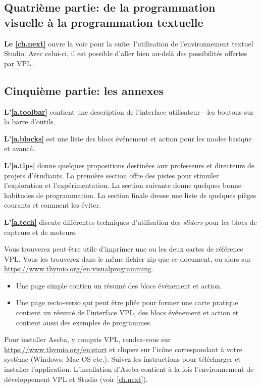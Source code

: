 \bigskip

\subsection*{Quatrième partie: de la programmation visuelle à la programmation textuelle}
\textbf{Le \cref{ch.next}} ouvre la voie pour la suite: l'utilisation de l'environnement textuel Studio.
Avec celui-ci, il est possible d'aller bien au-delà des possibilités offertes par VPL.

\bigskip

\subsection*{Cinquième partie: les annexes}

\textbf{L'\cref{a.toolbar}} contient une description de l'interface utilisateur---les boutons sur la barre d'outils.

\textbf{L'\cref{a.blocks}} est une liste des blocs événement et action pour les modes basique et avancé.

\textbf{L'\cref{a.tips}} donne quelques propositions destinées aux professeurs et directeurs de projets d'étudiants.
La première section offre des pistes pour stimuler l'exploration et l'expérimentation.
La section suivante donne quelques bonne habitudes de programmation.
La section finale dresse une liste de quelques pièges courants et comment les éviter.

\textbf{L'\cref{a.tech}} discute différentes techniques d'utilisation des \textit{sliders} pour les blocs de capteurs et de moteurs.

 \quad {}

Vous trouverez peut-être utile d'imprimer une ou les deux cartes de référence VPL.
Vous les trouverez dans le même fichier zip que ce document, ou alors sur \href{https://www.thymio.org/en:visualprogramming}{https://www.thymio.org/en:visualprogramming}.

\begin{itemize}
\item Une page simple contien un résumé des blocs événement et action.
\item Une page recto-verso qui peut être pliée pour former une carte pratique contient un résumé de l'interface VPL, des blocs événement et action et contient aussi des exemples de programmes.
\end{itemize}

Pour installer Aseba, y compris VPL, rendez-vous sur
\href{https://www.thymio.org/en:start}{https://www.thymio.org/en:start}
et cliquez sur l'icône correspondant à votre système (Windows, Mac OS etc.).
Suivez les instructions pour télécharger et installer l'application.
L'insallation d'Aseba contient à la fois l'environnement de développement VPL et Studio (voir \cref{ch.next}).
